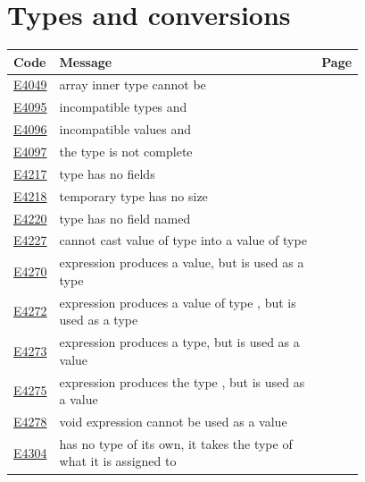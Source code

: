 
\clearpage
\section{Types and conversions}
\label{sec:codes:types}

\begin{longtable}{@{}l p{0.78\linewidth} r@{}}
\toprule Code & Message & Page\\ \midrule \endhead
\hyperref[sec:codes:e4049]{E4049} & array inner type cannot be \errhole{} & \pageref{sec:codes:e4049}\\
\hyperref[sec:codes:e4095]{E4095} & incompatible types \errhole{} and \errhole{} & \pageref{sec:codes:e4095}\\
\hyperref[sec:codes:e4096]{E4096} & incompatible values \errhole{} and \errhole{} & \pageref{sec:codes:e4096}\\
\hyperref[sec:codes:e4097]{E4097} & the type \errhole{} is not complete & \pageref{sec:codes:e4097}\\
\hyperref[sec:codes:e4217]{E4217} & type \errhole{} has no fields & \pageref{sec:codes:e4217}\\
\hyperref[sec:codes:e4218]{E4218} & temporary type \errhole{} has no size & \pageref{sec:codes:e4218}\\
\hyperref[sec:codes:e4220]{E4220} & type \errhole{} has no field named \errhole{} & \pageref{sec:codes:e4220}\\
\hyperref[sec:codes:e4227]{E4227} & cannot cast value of type \errhole{} into a value of type \errhole{} & \pageref{sec:codes:e4227}\\
\hyperref[sec:codes:e4270]{E4270} & expression produces a value, but is used as a type & \pageref{sec:codes:e4270}\\
\hyperref[sec:codes:e4272]{E4272} & expression produces a value of type \errhole{}, but is used as a type & \pageref{sec:codes:e4272}\\
\hyperref[sec:codes:e4273]{E4273} & expression produces a type, but is used as a value & \pageref{sec:codes:e4273}\\
\hyperref[sec:codes:e4275]{E4275} & expression produces the type \errhole{}, but is used as a value & \pageref{sec:codes:e4275}\\
\hyperref[sec:codes:e4278]{E4278} & void expression cannot be used as a value & \pageref{sec:codes:e4278}\\
\hyperref[sec:codes:e4304]{E4304} & \errhole{} has no type of its own, it takes the type of what it is assigned to & \pageref{sec:codes:e4304}\\
\bottomrule
\end{longtable}


